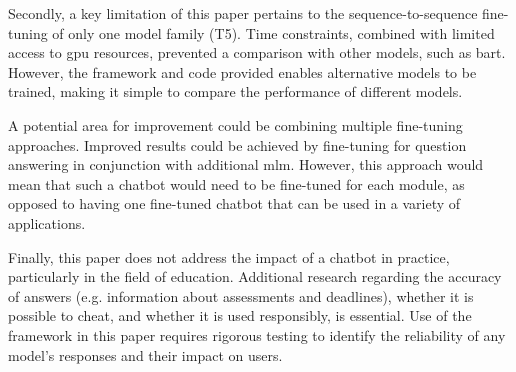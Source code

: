 Secondly, a key limitation of this paper pertains to the sequence-to-sequence fine-tuning of only one model family (T5). Time constraints, combined with limited access to \acrshort{gpu} resources, prevented a comparison with other models, such as \acrshort{bart}. However, the framework and code provided enables alternative models to be trained, making it simple to compare the performance of different models.

A potential area for improvement could be combining multiple fine-tuning approaches. Improved results could be achieved by fine-tuning for question answering in conjunction with additional \acrlong{mlm}. However, this approach would mean that such a chatbot would need to be fine-tuned for each module, as opposed to having one fine-tuned chatbot that can be used in a variety of applications.

Finally, this paper does not address the impact of a chatbot in practice, particularly in the field of education. Additional research regarding the accuracy of answers (e.g. information about assessments and deadlines), whether it is possible to cheat, and whether it is used responsibly, is essential. Use of the framework in this paper requires rigorous testing to identify the reliability of any model's responses and their impact on users.


